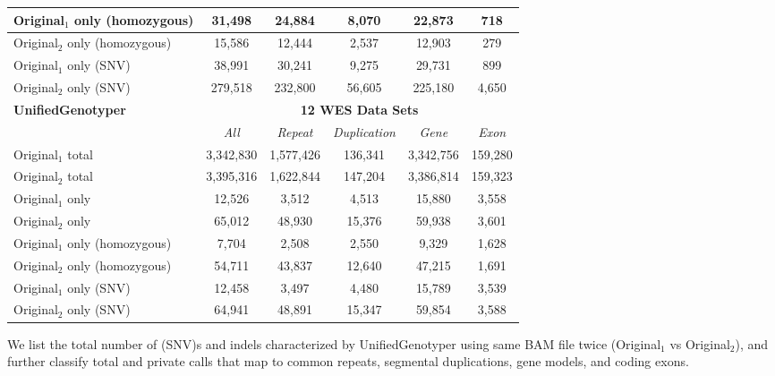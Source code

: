 \begin{table}[htb]
\begin{center}
\begin{tabular}{|l|c||c|c|c|c|}
\hline
Original$_1$ only (homozygous) & 31,498 & 24,884 & 8,070 & 22,873 & 718 \\
\hline
Original$_2$ only (homozygous) & 15,586 & 12,444 & 2,537 & 12,903 & 279 \\
\hline
Original$_1$ only (SNV) & 38,991 & 30,241 & 9,275 & 29,731 & 899 \\
\hline
Original$_2$ only (SNV) & 279,518 & 232,800 & 56,605 & 225,180 & 4,650 \\
\hline
\hline
{\bf UnifiedGenotyper} & \multicolumn{5}{|c|}{\bf 12 WES Data Sets} \\
\hline
\cline{2-6}
{\bf} & {\it All} & {\it Repeat} & {\it Duplication} & {\it Gene} & {\it Exon} \\
\hline
Original$_1$ total & 3,342,830 & 1,577,426 & 136,341 & 3,342,756 & 159,280 \\
\hline
Original$_2$ total & 3,395,316 & 1,622,844 & 147,204 & 3,386,814 & 159,323 \\
\hline
Original$_1$ only & 12,526 & 3,512 & 4,513 & 15,880 & 3,558 \\
\hline
Original$_2$ only & 65,012 & 48,930 & 15,376 & 59,938 & 3,601 \\
\hline
Original$_1$ only (homozygous) & 7,704 & 2,508 & 2,550 & 9,329 & 1,628 \\
\hline
Original$_2$ only (homozygous) & 54,711 & 43,837 & 12,640 & 47,215 & 1,691 \\
\hline
Original$_1$ only (SNV) & 12,458 & 3,497 & 4,480 & 15,789 & 3,539 \\
\hline
Original$_2$ only (SNV) & 64,941 & 48,891 & 15,347 & 59,854 & 3,588 \\
\hline
\end{tabular}
\end{center}
{\footnotesize We list the total number of (SNV)s and indels characterized by UnifiedGenotyper using same BAM file twice (Original$_1$ vs Original$_2$), 
and further classify total and private calls that map to common repeats, segmental duplications, gene models, and coding exons.}
\label{supptab:orig-vs-orig2-ug}
\end{table}

